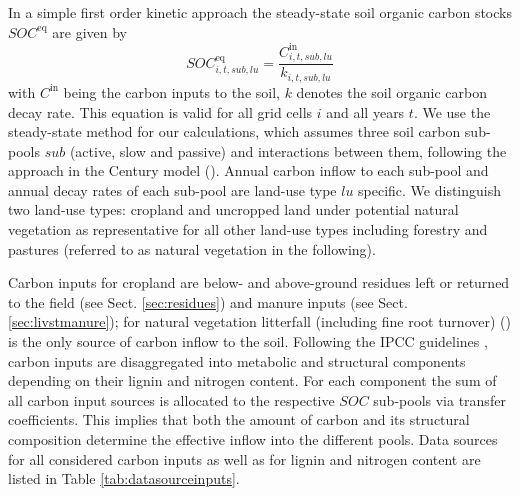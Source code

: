 \documentclass[gc, manuscript]{copernicus}
\begin{document}
In a simple first order kinetic approach the steady-state soil organic carbon stocks \(SOC^{\mathrm{eq}}\) are given by
\begin{equation}
SOC^{\mathrm{eq}}_{i,t,sub,lu} =\frac{C^{\mathrm{in}}_{i,t,sub,lu}}{k_{i,t,sub,lu}}
\label{eq:inoutflow}
\end{equation}
with \(C^{\textrm{in}}\) being the carbon inputs to the soil, \(k\) denotes the soil organic carbon decay rate. This equation is valid for all grid cells \(i\) and all years \(t\). We use the steady-state method for our calculations, which assumes three soil carbon sub-pools \(sub\) (active, slow and passive) and interactions between them, following the approach in the Century model (\citep{parton_analysis_1987}). Annual carbon inflow to each sub-pool and annual decay rates of each sub-pool are land-use type \(lu\) specific.
We distinguish two land-use types: cropland and uncropped land under potential natural vegetation as representative for all other land-use types including forestry and pastures (referred to as natural vegetation in the following).

Carbon inputs for cropland are below- and above-ground residues left or returned to the field (see Sect. \ref{sec:residues}) and manure inputs (see Sect. \ref{sec:livstmanure}); for natural vegetation litterfall (including fine root turnover) (\citep{schaphoff_lpjml4_2018}) is the only source of carbon inflow to the soil. Following the IPCC guidelines \citep{calvo_buendia_ipcc_2019}, carbon inputs are disaggregated into metabolic and structural components depending on their lignin and nitrogen content. For each component the sum of all carbon input sources is allocated to the respective \(SOC\) sub-pools via transfer coefficients. This implies that both the amount of carbon and its structural composition determine the effective inflow into the different pools. Data sources for all considered carbon inputs as well as for lignin and nitrogen content are listed in Table \ref{tab:datasourceinputs}.
\end{document}

